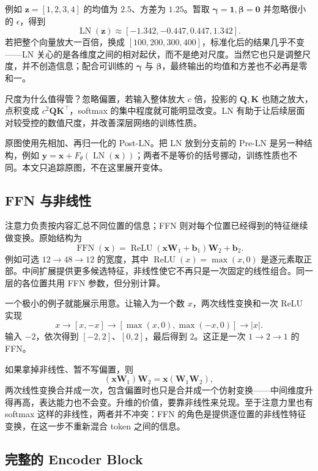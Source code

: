 \documentclass[UTF8,a4paper,12pt]{ctexart}
\numberwithin{equation}{section}
\DeclareMathOperator{\ReLU}{ReLU}
\DeclareMathOperator{\LN}{LN}
\DeclareMathOperator{\FFN}{FFN}
\begin{document}
例如 $\bm z=[1,2,3,4]$ 的均值为 $2.5$、方差为 $1.25$。暂取 $\bm\gamma=\bm1,\bm\beta=\bm0$ 并忽略很小的 $\epsilon$，得到
\[
\LN(\bm z)\approx[-1.342,-0.447,0.447,1.342].
\]
若把整个向量放大一百倍，换成 $[100,200,300,400]$，标准化后的结果几乎不变——LN 关心的是各维度之间的相对起伏，而不是绝对尺度。当然它也只是调整尺度，并不创造信息；配合可训练的 $\bm\gamma$ 与 $\bm\beta$，最终输出的均值和方差也不必再是零和一。

尺度为什么值得管？忽略偏置，若输入整体放大 $c$ 倍，投影的 $\bm Q,\bm K$ 也随之放大，点积变成 $c^2\bm Q\bm K^\top$，softmax 的集中程度就可能明显改变。LN 有助于让后续层面对较受控的数值尺度，并改善深层网络的训练性质。

原图使用先相加、再归一化的 Post-LN。把 LN 放到分支前的 Pre-LN 是另一种结构，例如 $\bm y=\bm x+F_\theta(\LN(\bm x))$；两者不是等价的括号挪动，训练性质也不同。本文只追踪原图，不在这里展开变体。

\subsection{FFN 与非线性}

注意力负责按内容汇总不同位置的信息；FFN 则对每个位置已经得到的特征继续做变换。原始结构为
\begin{equation}
\FFN(\bm x)=\ReLU(\bm x\bm W_1+\bm b_1)\bm W_2+\bm b_2.
\label{eq:ffn}
\end{equation}
例如可选 $12\rightarrow48\rightarrow12$ 的宽度，其中 $\ReLU(x)=\max(x,0)$ 是逐元素取正部。中间扩展提供更多候选特征，非线性使它不再只是一次固定的线性组合。同一层的各位置共用 FFN 参数，但分别计算。

一个极小的例子就能展示用意。让输入为一个数 $x$，两次线性变换和一次 ReLU 实现
\begin{equation}
 x\longrightarrow[x,-x]
 \longrightarrow[\max(x,0),\max(-x,0)]
 \longrightarrow |x|.
\label{eq:ffnabs}
\end{equation}
输入 $-2$，依次得到 $[-2,2]$、$[0,2]$，最后得到 $2$。这正是一次 $1\rightarrow2\rightarrow1$ 的 FFN。

如果拿掉非线性、暂不写偏置，则
\[
(\bm x\bm W_1)\bm W_2=\bm x(\bm W_1\bm W_2),
\]
两次线性变换合并成一次，包含偏置时也只是合并成一个仿射变换——中间维度升得再高，表达能力也不会变。升维的价值，要靠非线性来兑现。至于注意力里也有 softmax 这样的非线性，两者并不冲突：FFN 的角色是提供逐位置的非线性特征变换，在这一步不重新混合 token 之间的信息。

\subsection{完整的 Encoder Block}
\end{document}
